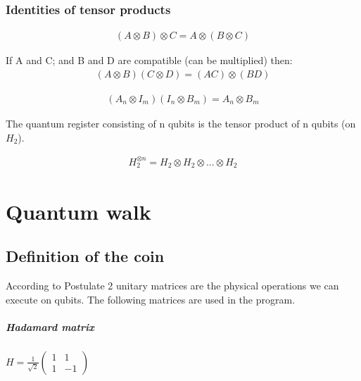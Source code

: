 
\subsection{Identities of tensor products}

\theorem[Associativity]
\begin{align}
  (A \otimes B) \otimes C = A \otimes (B \otimes C)
\end{align}

 If A and C; and B and D are compatible (can be multiplied) then:
\begin{align}
  (A \otimes B)(C \otimes D) = (AC) \otimes (BD)
\end{align}


\begin{align}
  (A_n \otimes I_m)(I_n \otimes B_m) = A_n \otimes B_m
\end{align}

 The quantum register consisting of n qubits is the tensor product of n qubits (on $H_2$).

\begin{align}
H_2^{\otimes{}n} = H_2 \otimes H_2 \otimes ... \otimes H_2
\end{align}

\chapter{Quantum walk}

\section{Definition of the coin}

According to Postulate 2 unitary matrices are the physical operations we can execute on qubits. The following matrices are used in the program.

\paragraph{Hadamard matrix}

\begin{center}
  $H = \frac{1}{\sqrt{2}}\begin{pmatrix}
      1 & 1  \\
      1 & -1
    \end{pmatrix}$
\end{center}

